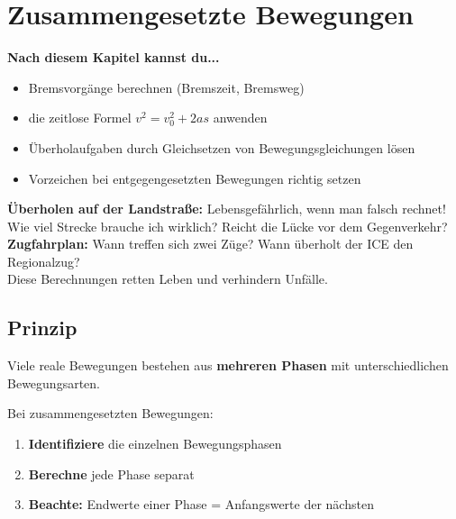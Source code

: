 \documentclass[11pt,a4paper]{article}
\begin{document}
\newpage
\section{Zusammengesetzte Bewegungen}

\begin{tcolorbox}[colback=merkegreen!5, colframe=merkegreen, boxrule=0.5pt]
\textbf{Nach diesem Kapitel kannst du...}
\begin{itemize}[itemsep=1pt]
\item[$\checkmark$] Bremsvorgänge berechnen (Bremszeit, Bremsweg)
\item[$\checkmark$] die zeitlose Formel $v^2 = v_0^2 + 2as$ anwenden
\item[$\checkmark$] Überholaufgaben durch Gleichsetzen von Bewegungsgleichungen lösen
\item[$\checkmark$] Vorzeichen bei entgegengesetzten Bewegungen richtig setzen
\end{itemize}
\end{tcolorbox}

\begin{alltag}
\textbf{Überholen auf der Landstraße:} Lebensgefährlich, wenn man falsch rechnet!\\[0.3em]
Wie viel Strecke brauche ich wirklich? Reicht die Lücke vor dem Gegenverkehr?\\[0.3em]
\textbf{Zugfahrplan:} Wann treffen sich zwei Züge? Wann überholt der ICE den Regionalzug?\\[0.3em]
Diese Berechnungen retten Leben und verhindern Unfälle.
\end{alltag}

\subsection{Prinzip}

Viele reale Bewegungen bestehen aus \textbf{mehreren Phasen} mit unterschiedlichen Bewegungsarten.

\begin{merksatz}
Bei zusammengesetzten Bewegungen:
\begin{enumerate}
\item \textbf{Identifiziere} die einzelnen Bewegungsphasen
\item \textbf{Berechne} jede Phase separat
\item \textbf{Beachte:} Endwerte einer Phase = Anfangswerte der nächsten
\end{enumerate}
\end{merksatz}
\end{document}
